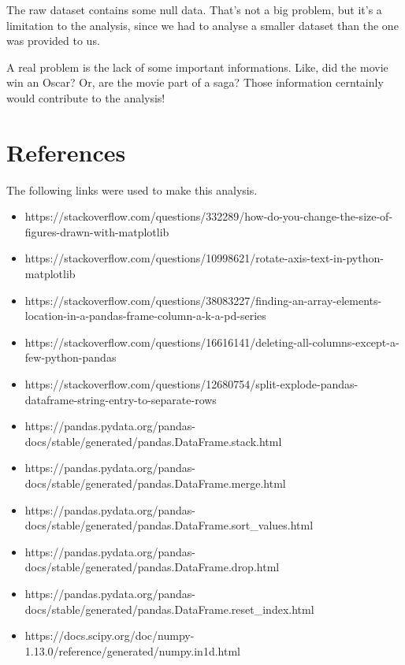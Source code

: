 \documentclass[11pt]{article}
\providecommand{\tightlist}{%
      \setlength{\itemsep}{0pt}\setlength{\parskip}{0pt}}
\begin{document}
The raw dataset contains some null data. That's not a big problem, but
it's a limitation to the analysis, since we had to analyse a smaller
dataset than the one was provided to us.

A real problem is the lack of some important informations. Like, did the
movie win an Oscar? Or, are the movie part of a saga? Those information
cerntainly would contribute to the analysis!

    \section{References}\label{references}

The following links were used to make this analysis.

\begin{itemize}
\tightlist
\item
  https://stackoverflow.com/questions/332289/how-do-you-change-the-size-of-figures-drawn-with-matplotlib
\item
  https://stackoverflow.com/questions/10998621/rotate-axis-text-in-python-matplotlib
\item
  https://stackoverflow.com/questions/38083227/finding-an-array-elements-location-in-a-pandas-frame-column-a-k-a-pd-series
\item
  https://stackoverflow.com/questions/16616141/deleting-all-columns-except-a-few-python-pandas
\item
  https://stackoverflow.com/questions/12680754/split-explode-pandas-dataframe-string-entry-to-separate-rows
\item
  https://pandas.pydata.org/pandas-docs/stable/generated/pandas.DataFrame.stack.html
\item
  https://pandas.pydata.org/pandas-docs/stable/generated/pandas.DataFrame.merge.html
\item
  https://pandas.pydata.org/pandas-docs/stable/generated/pandas.DataFrame.sort\_values.html
\item
  https://pandas.pydata.org/pandas-docs/stable/generated/pandas.DataFrame.drop.html
\item
  https://pandas.pydata.org/pandas-docs/stable/generated/pandas.DataFrame.reset\_index.html
\item
  https://docs.scipy.org/doc/numpy-1.13.0/reference/generated/numpy.in1d.html
\end{itemize}


    
    
    
    
\end{document}
